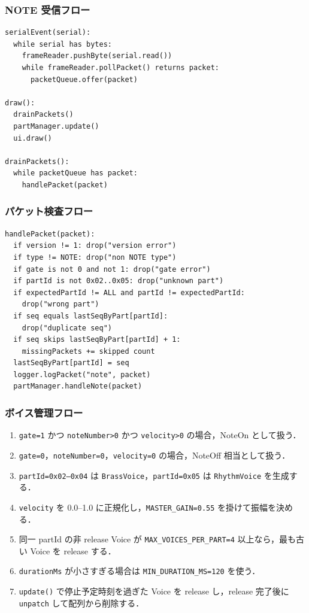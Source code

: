 \documentclass[lualatex,book,paper=a4paper,jafontsize=11.5pt,jafontscale=1.05]{jlreq}
\begin{document}
\subsubsection{NOTE 受信フロー}
\begin{lstlisting}[style=pseudo, caption={NOTE 受信から発音までの処理フロー}, label={lst:receive-flow}]
serialEvent(serial):
  while serial has bytes:
    frameReader.pushByte(serial.read())
    while frameReader.pollPacket() returns packet:
      packetQueue.offer(packet)

draw():
  drainPackets()
  partManager.update()
  ui.draw()

drainPackets():
  while packetQueue has packet:
    handlePacket(packet)
\end{lstlisting}

\subsubsection{パケット検査フロー}
\begin{lstlisting}[style=pseudo, caption={handlePacket の検査フロー}, label={lst:packet-flow}]
handlePacket(packet):
  if version != 1: drop("version error")
  if type != NOTE: drop("non NOTE type")
  if gate is not 0 and not 1: drop("gate error")
  if partId is not 0x02..0x05: drop("unknown part")
  if expectedPartId != ALL and partId != expectedPartId:
    drop("wrong part")
  if seq equals lastSeqByPart[partId]:
    drop("duplicate seq")
  if seq skips lastSeqByPart[partId] + 1:
    missingPackets += skipped count
  lastSeqByPart[partId] = seq
  logger.logPacket("note", packet)
  partManager.handleNote(packet)
\end{lstlisting}

\subsubsection{ボイス管理フロー}
\begin{enumerate}
  \item \texttt{gate=1} かつ \texttt{noteNumber>0} かつ \texttt{velocity>0} の場合，NoteOn として扱う．
  \item \texttt{gate=0}，\texttt{noteNumber=0}，\texttt{velocity=0} の場合，NoteOff 相当として扱う．
  \item \texttt{partId=0x02--0x04} は \texttt{BrassVoice}，\texttt{partId=0x05} は \texttt{RhythmVoice} を生成する．
  \item \texttt{velocity} を 0.0--1.0 に正規化し，\texttt{MASTER\_GAIN=0.55} を掛けて振幅を決める．
  \item 同一 partId の非 release Voice が \texttt{MAX\_VOICES\_PER\_PART=4} 以上なら，最も古い Voice を release する．
  \item \texttt{durationMs} が小さすぎる場合は \texttt{MIN\_DURATION\_MS=120} を使う．
  \item \texttt{update()} で停止予定時刻を過ぎた Voice を release し，release 完了後に \texttt{unpatch} して配列から削除する．
\end{enumerate}
\end{document}
